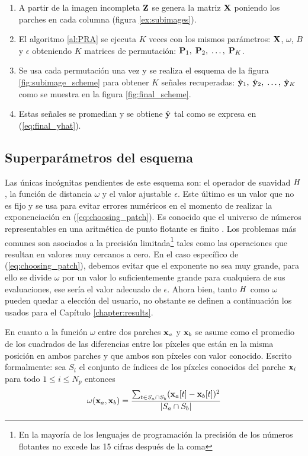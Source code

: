 \begin{enumerate}
	\item A partir de la imagen incompleta $\Z$ se genera la matriz $\X$ poniendo los parches en cada columna (figura \ref{ex:subimages}).
	\item El algoritmo \ref{al:PRA} se ejecuta $K$ veces con los mismos par\'ametros: $\X$, $\omega$, $B$ y $\epsilon$ obteniendo $K$ matrices de permutaci\'on: $\P_1,\; \P_2,\; \dots,\; \P_K$.
	\item Se usa cada permutaci\'on una vez y se realiza el esquema de la figura \ref{fig:subimage_scheme} para obtener $K$ señales recuperadas: $\yhat_1,\; \yhat_2,\; \dots,\; \yhat_K$ como se muestra en la figura \ref{fig:final_scheme}.
	\item Estas señales se promedian y se obtiene $\yhat$ tal como se expresa en (\ref{eq:final_yhat}).
\end{enumerate}

\subsection{Superpar\'ametros del esquema}
Las \'unicas incógnitas pendientes de este esquema son: el operador de suavidad $\H$, la funci\'on de distancia $\omega$ y el valor ajustable $\epsilon$. Este \'ultimo es un valor que no es fijo y se usa para evitar errores num\'ericos en el momento de realizar la exponenciaci\'on en (\ref{eq:choosing_patch}). Es conocido que el universo de números representables en una aritmética de punto flotante es finito \cite{conte2017elementary}. Los problemas m\'as comunes son asociados a la precisión limitada\footnote{En la mayoría de los lenguajes de programación la precisión de los n\'umeros flotantes no excede las 15 cifras despu\'es de la coma} tales como las operaciones que resultan en valores muy cercanos a cero. En el caso espec\'ifico de (\ref{eq:choosing_patch}), debemos evitar que el exponente no sea muy grande, para ello se divide $\omega$ por un valor lo suficientemente grande para cualquiera de sus evaluaciones, ese ser\'ia el valor adecuado de $\epsilon$. Ahora bien, tanto $\H$ como $\omega$ pueden quedar a elecci\'on del usuario, no obstante se definen a continuaci\'on los usados para el Cap\'itulo \ref{chapter:results}.

En cuanto a la funci\'on $\omega$ entre dos parches $\x_a$ y $\x_b$ se asume como el promedio de los cuadrados de las diferencias entre los p\'ixeles que est\'an en la misma posici\'on en ambos parches y que ambos son p\'ixeles con valor conocido. Escrito formalmente: sea $S_i$ el conjunto de \'indices de los p\'ixeles conocidos del parche $\x_i$ para todo $1 \le i \le N_p$ entonces
\begin{equation}
	\omega(\x_a, \x_b) = \frac{\sum_{t \in S_a \cap S_b} (\x_a[t] - \x_b[t])^2}{|S_a \cap S_b|}
	\label{eq:omega}
\end{equation}

